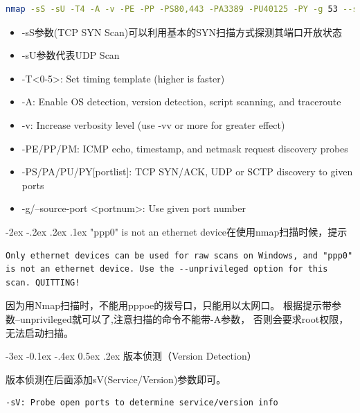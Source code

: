 \documentclass[11pt,fleqn]{book}
\makeatletter
\numberwithin{dummy}{section}
\theoremstyle{ocrenumbox}
\theoremstyle{blacknumex}
\theoremstyle{blacknumbox}
\theoremstyle{ocrenum}
\renewcommand{\subsection}{\@startsection {subsection}{2}{\z@}
	{-3ex \@plus -0.1ex \@minus -.4ex}
	{0.5ex \@plus.2ex }
	{\normalfont\sffamily\bfseries}}
\renewcommand\paragraph{\@startsection{paragraph}{4}{\z@}
	{-2ex \@plus-.2ex \@minus .2ex}
	{.1ex}
	{\normalfont\small\sffamily\bfseries}}
\makeatother
\begin{document}
\begin{lstlisting}[language=Bash]
nmap -sS -sU -T4 -A -v -PE -PP -PS80,443 -PA3389 -PU40125 -PY -g 53 --script "default or (discovery and safe)" 12.26.32.14 
\end{lstlisting}

\begin{itemize}
	\item{-sS参数(TCP SYN Scan)可以利用基本的SYN扫描方式探测其端口开放状态}
	\item{-sU参数代表UDP Scan}
	\item{-T<0-5>: Set timing template (higher is faster)}
	\item{-A: Enable OS detection, version detection, script scanning, and traceroute}
	\item{-v: Increase verbosity level (use -vv or more for greater effect)}
	\item{-PE/PP/PM: ICMP echo, timestamp, and netmask request discovery probes}
	\item{-PS/PA/PU/PY[portlist]: TCP SYN/ACK, UDP or SCTP discovery to given ports}
	\item{-g/--source-port <portnum>: Use given port number}
\end{itemize}


\paragraph{"ppp0" is not an ethernet device}在使用nmap扫描时候，提示 

\begin{lstlisting}
Only ethernet devices can be used for raw scans on Windows, and "ppp0" is not an ethernet device. Use the --unprivileged option for this scan. QUITTING!
\end{lstlisting}

因为用Nmap扫描时，不能用pppoe的拨号口，只能用以太网口。
根据提示带参数--unprivileged就可以了,注意扫描的命令不能带-A参数，
否则会要求root权限，无法启动扫描。 


\subsection{版本侦测（Version Detection）}

版本侦测在后面添加sV(Service/Version)参数即可。

\begin{lstlisting}[language=Bash]
-sV: Probe open ports to determine service/version info
\end{lstlisting}
\end{document}
